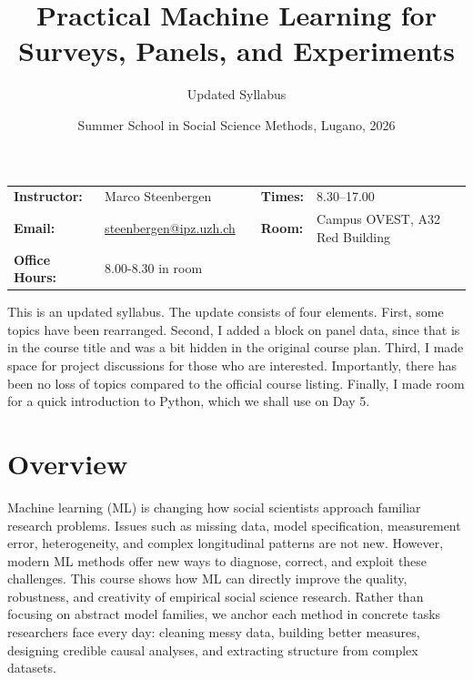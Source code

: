 \documentclass{article}
\title{Practical Machine Learning for Surveys, Panels, and Experiments}
\author{Updated Syllabus}
\date{Summer School in Social Science Methods, Lugano, 2026}
\begin{document}
\maketitle

\begin{table}[h]
\centering
\begin{footnotesize}  %
\begin{tabular}{p{2cm}p{2.75cm}p{.5cm}p{2cm}p{2.25cm}}
\hline\hline
\textbf{Instructor:} & Marco Steenbergen & & \textbf{Times:} & 8.30--17.00 \\
\textbf{Email:} & \href{mailto:steenbergen@ipz.uzh.ch}{steenbergen@ipz.uzh.ch} & & \textbf{Room:} & Campus OVEST, A32 Red Building \\
\textbf{Office Hours:} & 8.00-8.30 in room & & &  \\
\hline\hline
\end{tabular}
\end{footnotesize}
\end{table}

\vspace{.25in}
\begin{small}
\noindent This is an updated syllabus. The update consists of four elements. First, some topics have been rearranged. Second, I added a block on panel data, since that is in the course title and was a bit hidden in the original course plan. Third, I made space for project discussions for those who are interested. Importantly, there has been no loss of topics compared to the official course listing. Finally, I made room for a quick introduction to Python, which we shall use on Day 5.
\end{small}

\section{Overview}
Machine learning (ML) is changing how social scientists approach familiar research problems. Issues such as missing data, model specification, measurement error, heterogeneity, and complex longitudinal patterns are not new. However, modern ML methods offer new ways to diagnose, correct, and exploit these challenges. This course shows how ML can directly improve the quality, robustness, and creativity of empirical social science research. Rather than focusing on abstract model families, we anchor each method in concrete tasks researchers face every day: cleaning messy data, building better measures, designing credible causal analyses, and extracting structure from complex datasets. \\
\end{document}
